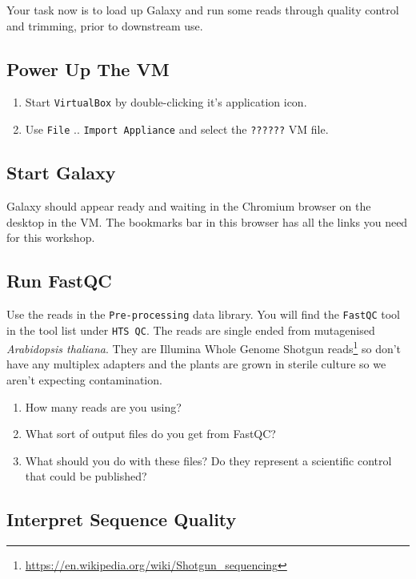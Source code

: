 \documentclass[12pt,]{book}
\providecommand{\tightlist}{%
  \setlength{\itemsep}{0pt}\setlength{\parskip}{0pt}}
\let\rmarkdownfootnote\footnote%
\def\footnote{\protect\rmarkdownfootnote}
\renewcommand{\href}[2]{#2\footnote{\url{#1}}}
\begin{document}
Your task now is to load up Galaxy and run some reads through quality
control and trimming, prior to downstream use.

\subsection{Power Up The VM}\label{power-up-the-vm}

\begin{enumerate}
\def\labelenumi{\arabic{enumi}.}
\tightlist
\item
  Start \texttt{VirtualBox} by double-clicking it's application icon.
\item
  Use \texttt{File} .. \texttt{Import\ Appliance} and select the
  \texttt{??????} VM file.
\end{enumerate}

\subsection{Start Galaxy}\label{start-galaxy}

Galaxy should appear ready and waiting in the Chromium browser on the
desktop in the VM. The bookmarks bar in this browser has all the links
you need for this workshop.

\subsection{Run FastQC}\label{run-fastqc}

Use the reads in the \texttt{Pre-processing} data library. You will find
the \texttt{FastQC} tool in the tool list under \texttt{HTS\ QC}. The
reads are single ended from mutagenised \emph{Arabidopsis thaliana}.
They are Illumina
\href{https://en.wikipedia.org/wiki/Shotgun_sequencing}{Whole Genome
Shotgun reads} so don't have any multiplex adapters and the plants are
grown in sterile culture so we aren't expecting contamination.

\begin{enumerate}
\def\labelenumi{\arabic{enumi}.}
\tightlist
\item
  How many reads are you using?
\item
  What sort of output files do you get from FastQC?
\item
  What should you do with these files? Do they represent a scientific
  control that could be published?
\end{enumerate}

\subsection{Interpret Sequence
Quality}\label{interpret-sequence-quality}
\end{document}

